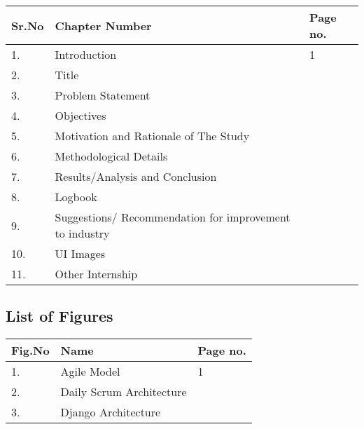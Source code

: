 \documentclass[12pt]{article}
\begin{document}
\vspace{1.5cm}
\begin{center}
    
\begin{tabular}{|p{0.4in}|p{0.4in}|p{2.5in}|p{1.2in}|} \hline 
\multicolumn{2}{|p{1in}|}{Sr.No } & Chapter Number  & \textbf{Page no. } \\ \hline 
\multicolumn{2}{|p{1in}|}{1. } & Introduction  & 1  \\ \hline 
\multicolumn{2}{|p{1in}|}{2. } & Title  &   \\ \hline
  
\multicolumn{2}{|p{1in}|}{3. } & Problem Statement  &   \\ \hline 
\multicolumn{2}{|p{1in}|}{4. } & Objectives  &   \\ \hline 
\multicolumn{2}{|p{1in}|}{5. } & Motivation and Rationale of The Study  &   \\ \hline  
  
\multicolumn{2}{|p{1in}|}{6. } & Methodological Details  &   \\ \hline    
\multicolumn{2}{|p{1in}|}{7. } & Results/Analysis and Conclusion  &   \\ \hline 

\multicolumn{2}{|p{1in}|}{8. } & Logbook  &   \\ \hline 

\multicolumn{2}{|p{1in}|}{9. } & Suggestions/ Recommendation for improvement to industry  &   \\ \hline 
\multicolumn{2}{|p{1in}|}{10. } & UI Images   &   \\ \hline 
\multicolumn{2}{|p{1in}|}{11. } & Other Internship   &   \\ \hline 

   
\end{tabular}
\end{center}
\pagebreak
\newpage
\begin{center}
    \section*{List of Figures}
\end{center}
\vspace{1.5cm}
\begin{center}
    
\begin{tabular}{|p{0.4in}|p{0.4in}|p{2.5in}|p{1.2in}|} \hline 
\multicolumn{2}{|p{1in}|}{Fig.No } & Name  & \textbf{Page no. } \\ \hline 
\multicolumn{2}{|p{1in}|}{1. } & Agile Model  & 1  \\ \hline 
\multicolumn{2}{|p{1in}|}{2. } & Daily Scrum Architecture   &   \\ \hline
  
\multicolumn{2}{|p{1in}|}{3. } & Django Architecture   &   \\ \hline 
   
\end{tabular}
\end{center}
\bigskip
\end{document}
